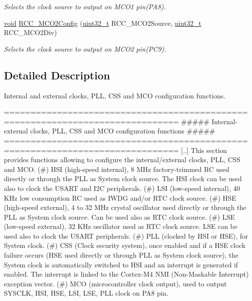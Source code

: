 \begin{DoxyCompactItemize}
\begin{DoxyCompactList}\small\item\em Selects the clock source to output on M\-C\-O1 pin(\-P\-A8). \end{DoxyCompactList}\item 
\hyperlink{group___n_a_m_e_ga18028b8badbf1ea7e704ccac3c488e82}{void} \hyperlink{group___r_c_c___group1_gaf50f10675b747de60c739e44e5c22aee}{R\-C\-C\-\_\-\-M\-C\-O2\-Config} (\hyperlink{stdint_8h_a435d1572bf3f880d55459d9805097f62}{uint32\-\_\-t} R\-C\-C\-\_\-\-M\-C\-O2\-Source, \hyperlink{stdint_8h_a435d1572bf3f880d55459d9805097f62}{uint32\-\_\-t} R\-C\-C\-\_\-\-M\-C\-O2\-Div)
\begin{DoxyCompactList}\small\item\em Selects the clock source to output on M\-C\-O2 pin(\-P\-C9). \end{DoxyCompactList}\end{DoxyCompactItemize}


\subsection{Detailed Description}
Internal and external clocks, P\-L\-L, C\-S\-S and M\-C\-O configuration functions. \begin{DoxyVerb} ===============================================================================
 ##### Internal-external clocks, PLL, CSS and MCO configuration functions #####
 ===============================================================================  
    [..] This section provides functions allowing to configure the internal/external 
         clocks, PLL, CSS and MCO.
         (#) HSI (high-speed internal), 8 MHz factory-trimmed RC used directly 
             or through the PLL as System clock source.
             The HSI clock can be used also to clock the USART and I2C peripherals.
         (#) LSI (low-speed internal), 40 KHz low consumption RC used as IWDG and/or RTC
             clock source.
         (#) HSE (high-speed external), 4 to 32 MHz crystal oscillator used directly or
             through the PLL as System clock source. Can be used also as RTC clock source.
         (#) LSE (low-speed external), 32 KHz oscillator used as RTC clock source.
             LSE can be used also to clock the USART peripherals.
         (#) PLL (clocked by HSI or HSE), for System clock.
         (#) CSS (Clock security system), once enabled and if a HSE clock failure occurs 
             (HSE used directly or through PLL as System clock source), the System clock
             is automatically switched to HSI and an interrupt is generated if enabled. 
             The interrupt is linked to the Cortex-M4 NMI (Non-Maskable Interrupt) 
             exception vector.   
         (#) MCO (microcontroller clock output), used to output SYSCLK, HSI, HSE, LSI, LSE,
             PLL clock on PA8 pin.\end{DoxyVerb}


